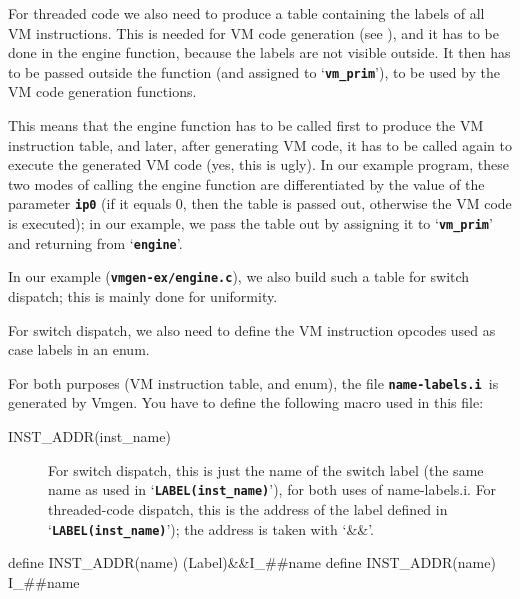 \documentclass[10pt,english]{article}
\begin{document}
For threaded code we also need to produce a table containing the labels
of all VM instructions. This is needed for VM code generation (see
), and it has to be done in the engine
function, because the labels are not visible outside. It then has
to be passed outside the function (and assigned to \textquoteleft{}\texttt{\textbf{vm\_prim}}\textquoteright{}),
to be used by the VM code generation functions.

This means that the engine function has to be called first to produce
the VM instruction table, and later, after generating VM code, it
has to be called again to execute the generated VM code (yes, this
is ugly). In our example program, these two modes of calling the engine
function are differentiated by the value of the parameter \texttt{\textbf{ip0}}
(if it equals 0, then the table is passed out, otherwise the VM code
is executed); in our example, we pass the table out by assigning it
to \textquoteleft{}\texttt{\textbf{vm\_prim}}\textquoteright{} and
returning from \textquoteleft{}\texttt{\textbf{engine}}\textquoteright{}.

In our example (\texttt{\textbf{vmgen-ex/engine.c}}), we also build
such a table for switch dispatch; this is mainly done for uniformity.

For switch dispatch, we also need to define the VM instruction opcodes
used as case labels in an enum.

For both purposes (VM instruction table, and enum), the file \texttt{\textbf{name-labels.i
}}is generated by Vmgen. You have to define the following macro used
in this file:
\begin{description}
\item [{INST\_ADDR(inst\_name)}] For switch dispatch, this is just the
name of the switch label (the same name as used in \textquoteleft{}\texttt{\textbf{LABEL(inst\_name)}}\textquoteright{}),
for both uses of name-labels.i. For threaded-code dispatch, this is
the address of the label defined in \textquoteleft{}\texttt{\textbf{LABEL(inst\_name)}}\textquoteright{});
the address is taken with \textquoteleft{}\&\&\textquoteright{}.
\end{description}
\nwenddocs{}\endmoddef
define INST_ADDR(name) (Label)&&I_##name
\nwendcode{}\nwdocspar
\nwenddocs{}\endmoddef
define INST_ADDR(name) I_##name
\nwendcode{}\nwdocspar
\end{document}
